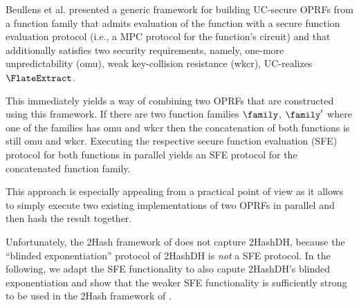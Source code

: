 

Beullens et al. \cite{EPRINT:BDFH24} presented a generic framework for building UC-secure OPRFs from a function family that admits evaluation of the function with a secure function evaluation protocol (i.e., a MPC protocol for the function's circuit) and that additionally satisfies two security requirements,
namely, one-more unpredictability (omu), weak key-collision resistance (wkcr), UC-realizes $\FlateExtract$.

This immediately yields a way of combining two OPRFs that are constructed
using this framework. If there are two function families
$\family$, $\family'$ where one of the families has omu and wkcr then the concatenation of both functions is still omu and wkcr. Executing the respective secure function evaluation (SFE) protocol for both functions in parallel yields an SFE protocol for the concatenated function family.

This approach is especially appealing from a practical point of view as it 
allows to simply execute two existing implementations of two OPRFs in parallel and then hash the result together.

Unfortunately, the 2Hash framework of \cite{EPRINT:BDFH24} does not capture 2HashDH, because the \enquote{blinded exponentiation} protocol of 2HashDH is \emph{not} a SFE protocol. In the following, we adapt the SFE functionality to also capute 2HashDH's blinded exponentiation and  show that
the weaker SFE functionality is sufficiently strong to be used in the 2Hash framework of \cite{EPRINT:BDFH24}.


